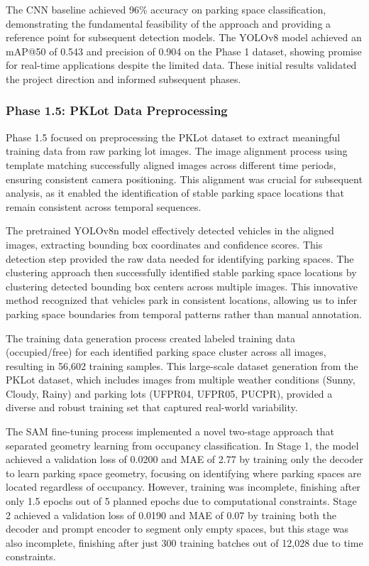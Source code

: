 \documentclass[12pt,a4paper]{article}
\begin{document}
The CNN baseline achieved 96\% accuracy on parking space classification, demonstrating the fundamental feasibility of the approach and providing a reference point for subsequent detection models. The YOLOv8 model achieved an mAP@50 of 0.543 and precision of 0.904 on the Phase 1 dataset, showing promise for real-time applications despite the limited data. These initial results validated the project direction and informed subsequent phases.

\subsubsection{Phase 1.5: PKLot Data Preprocessing}

Phase 1.5 focused on preprocessing the PKLot dataset to extract meaningful training data from raw parking lot images. The image alignment process using template matching successfully aligned images across different time periods, ensuring consistent camera positioning. This alignment was crucial for subsequent analysis, as it enabled the identification of stable parking space locations that remain consistent across temporal sequences.

The pretrained YOLOv8n model effectively detected vehicles in the aligned images, extracting bounding box coordinates and confidence scores. This detection step provided the raw data needed for identifying parking spaces. The clustering approach then successfully identified stable parking space locations by clustering detected bounding box centers across multiple images. This innovative method recognized that vehicles park in consistent locations, allowing us to infer parking space boundaries from temporal patterns rather than manual annotation.

The training data generation process created labeled training data (occupied/free) for each identified parking space cluster across all images, resulting in 56,602 training samples. This large-scale dataset generation from the PKLot dataset, which includes images from multiple weather conditions (Sunny, Cloudy, Rainy) and parking lots (UFPR04, UFPR05, PUCPR), provided a diverse and robust training set that captured real-world variability.

The SAM fine-tuning process implemented a novel two-stage approach that separated geometry learning from occupancy classification. In Stage 1, the model achieved a validation loss of 0.0200 and MAE of 2.77 by training only the decoder to learn parking space geometry, focusing on identifying where parking spaces are located regardless of occupancy. However, training was incomplete, finishing after only 1.5 epochs out of 5 planned epochs due to computational constraints. Stage 2 achieved a validation loss of 0.0190 and MAE of 0.07 by training both the decoder and prompt encoder to segment only empty spaces, but this stage was also incomplete, finishing after just 300 training batches out of 12,028 due to time constraints. 
\end{document}
